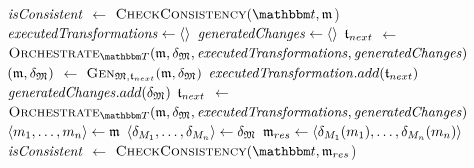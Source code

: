 \begin{algorithm}
    \begin{algorithmic}[1]
            \State $\mathit{isConsistent}$ $\leftarrow$ $\function{CheckConsistency}(\transformationset{t}, \modeltuple{m}$)
                \State \Return{$\bot$}
            \EndIf
            \State $\mathit{executedTransformations} \leftarrow \langle  \rangle$
            \State $\mathit{generatedChanges} \leftarrow \langle  \rangle$
            \State $\mathfrak{t}_{next}$ $\leftarrow$ $\function{Orchestrate}_{\transformationset{T}}(\modeltuple{m}, \changetuple{\metamodeltuple{M}}, \mathvariable{executedTransformations}, \mathvariable{generatedChanges})$ \label{algo:orchestration:application:line:startorchestrate}
                \State $(\mathfrak{m}, \mathfrak{\delta}_{\mathfrak{M}})$ $\leftarrow$ $\textsc{Gen}_{\mathfrak{M}, \mathfrak{t}_{next}}(\mathfrak{m}, \mathfrak{\delta}_{\mathfrak{M}})$ \label{algo:orchestration:application:line:stepcalculation}
                \State $\mathit{executedTransformation}.add(\mathfrak{t}_{next})$
                \State $\mathit{generatedChanges}.add(\mathfrak{\delta}_{\mathfrak{M}})$
                \State $\mathfrak{t}_{next}$ $\leftarrow$ $\function{Orchestrate}_{\transformationset{T}}(\modeltuple{m}, \changetuple{\metamodeltuple{M}}, \mathvariable{executedTransformations}, \mathvariable{generatedChanges})$
            \EndWhile \label{algo:orchestration:application:line:endorchestrate}
            \State $\langle m_{1}, \dots, m_{n} \rangle \leftarrow \mathfrak{m}$
            \State $\langle \delta_{M_{1}}, \dots, \delta_{M_{n}} \rangle \leftarrow \mathfrak{\delta}_{\mathfrak{M}}$
            \State $\mathfrak{m}_{res} \leftarrow \langle \delta_{M_{1}}(m_{1}), \dots, \delta_{M_{n}}(m_{n}) \rangle$
            \State $\mathit{isConsistent}$ $\leftarrow$ $\function{CheckConsistency}(\transformationset{t}, \modeltuple{m}_{res}$) \label{algo:orchestration:application:line:startconsistencycheck}
                \State \Return{$\bot$}
            \EndIf \label{algo:orchestration:application:line:endconsistencycheck}

\end{algorithmic}
\end{algorithm}
